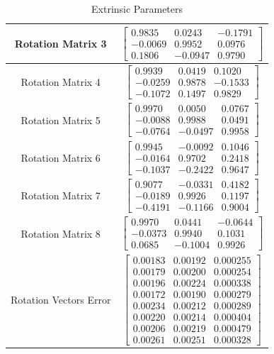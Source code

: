 \documentclass[10pt,twocolumn,letterpaper]{article}
\begin{document}
\begin{table}[h]
\begin{tabular}{c|c}
        \hline
        Rotation Matrix 3 & 
        $\begin{bmatrix}
    0.9835   & 0.0243  & -0.1791\\
   -0.0069  &  0.9952  &  0.0976\\
    0.1806  & -0.0947  &  0.9790
        \end{bmatrix}$ \\ 
        \hline
        Rotation Matrix 4 & 
        $\begin{bmatrix}
    0.9939  &  0.0419  &  0.1020\\
   -0.0259  &  0.9878  & -0.1533\\
   -0.1072  &  0.1497  &  0.9829
        \end{bmatrix}$ \\ 
        \hline
        Rotation Matrix 5 & 
        $\begin{bmatrix}
    0.9970  &  0.0050 &   0.0767\\
   -0.0088  &  0.9988 &   0.0491\\
   -0.0764  & -0.0497 &   0.9958
        \end{bmatrix}$ \\ 
        \hline
        Rotation Matrix 6 & 
        $\begin{bmatrix}
    0.9945  & -0.0092   & 0.1046\\
   -0.0164  &  0.9702 &   0.2418\\
   -0.1037  & -0.2422  &  0.9647
        \end{bmatrix}$ \\ 
        \hline
        Rotation Matrix 7 & 
        $\begin{bmatrix}
    0.9077  & -0.0331  &  0.4182\\
   -0.0189 &   0.9926  &  0.1197\\
   -0.4191  & -0.1166 &   0.9004
        \end{bmatrix}$ \\ 
        \hline
        Rotation Matrix 8 & 
        $\begin{bmatrix}
    0.9970  &  0.0441  & -0.0644\\
   -0.0373  &  0.9940  &  0.1031\\
    0.0685  & -0.1004  &  0.9926
        \end{bmatrix}$ \\ 
        \hline
                Rotation Vectors Error   & 
        $\begin{bmatrix}
0.00183 &	0.00192&	0.000255\\
0.00179&	0.00200&	0.000254\\
0.00196&	0.00224&	0.000338\\
0.00172&	0.00190&	0.000279\\
0.00234&	0.00212&	0.000289\\
0.00220&	0.00214&	0.000404\\
0.00206&	0.00219&	0.000479\\
0.00261&	0.00251&	0.000328
        \end{bmatrix}$ \\ 
    \end{tabular}%
    \medbreak
    \caption{Extrinsic Parameters}
\end{table}
\end{document}
